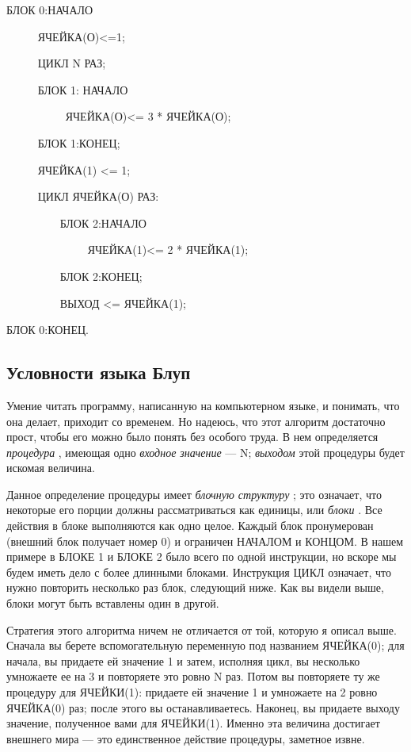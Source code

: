 \documentclass[../main.tex]{subfiles}
\begin{document}
БЛОК 0:НАЧАЛО

~~~~~ ЯЧЕЙКА(О)\textless=1;

~~~~~ ЦИКЛ N РАЗ;

~~~~~ БЛОК 1: НАЧАЛО

~~~~~~~~~~ ЯЧЕЙКА(О)\textless= 3 * ЯЧЕЙКА(О);

~~~~~ БЛОК 1:КОНЕЦ;

~~~~~ ЯЧЕЙКА(1) \textless= 1;

~~~~~ ЦИКЛ ЯЧЕЙКА(О) РАЗ:

~~~~~~~~~ БЛОК 2:НАЧАЛО

~~~~~~~~~~~~~~ ЯЧЕЙКА(1)\textless= 2 * ЯЧЕЙКА(1);

~~~~~~~~~ БЛОК 2:КОНЕЦ;

~~~~~~~~~ ВЫХОД \textless= ЯЧЕЙКА(1);

БЛОК 0:КОНЕЦ.


\subsection{Условности языка Блуп}

Умение читать программу, написанную на компьютерном языке, и понимать, что она делает, приходит со временем. Но надеюсь, что этот алгоритм достаточно прост, чтобы его можно было понять без особого труда. В нем определяется \emph{процедура} , имеющая одно \emph{входное значение} --- N; \emph{выходом} этой процедуры будет искомая величина.

Данное определение процедуры имеет \emph{блочную структуру} ; это означает, что некоторые его порции должны рассматриваться как единицы, или \emph{блоки} . Все действия в блоке выполняются как одно целое. Каждый блок пронумерован (внешний блок получает номер 0) и ограничен НАЧАЛОМ и КОНЦОМ. В нашем примере в БЛОКЕ 1 и БЛОКЕ 2 было всего по одной инструкции, но вскоре мы будем иметь дело с более длинными блоками. Инструкция ЦИКЛ означает, что нужно повторить несколько раз блок, следующий ниже. Как вы видели выше, блоки могут быть вставлены один в другой.

Стратегия этого алгоритма ничем не отличается от той, которую я описал выше. Сначала вы берете вспомогательную переменную под названием ЯЧЕЙКА(0); для начала, вы придаете ей значение 1 и затем, исполняя цикл, вы несколько умножаете ее на 3 и повторяете это ровно N раз. Потом вы повторяете ту же процедуру для ЯЧЕЙКИ(1): придаете ей значение 1 и умножаете на 2 ровно ЯЧЕЙКА(0) раз; после этого вы останавливаетесь. Наконец, вы придаете выходу значение, полученное вами для ЯЧЕЙКИ(1). Именно эта величина достигает внешнего мира --- это единственное действие процедуры, заметное извне.
\end{document}
